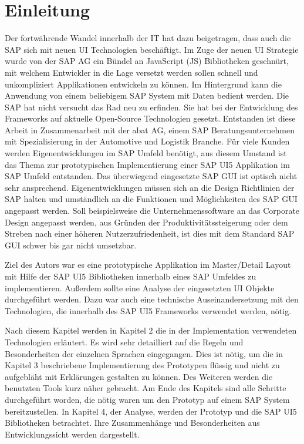 \section{Einleitung}\label{einleitung}
Der fortwährende Wandel innerhalb der IT hat dazu beigetragen, dass auch die SAP sich mit neuen UI Technologien beschäftigt. Im Zuge der neuen UI Strategie wurde von der SAP AG ein Bündel an JavaScript (JS) Bibliotheken geschnürt, mit welchem Entwickler in die Lage versetzt werden sollen schnell und unkompliziert Applikationen entwickeln zu können. Im Hintergrund kann die Anwendung von einem beliebigem SAP System mit Daten bedient werden. Die SAP hat nicht versucht das Rad neu zu erfinden. Sie hat bei der Entwicklung des Frameworks auf aktuelle Open-Source Technologien gesetzt. Entstanden ist diese Arbeit in Zusammenarbeit mit der abat AG, einem SAP Beratungsunternehmen mit Spezialisierung in der Automotive  und Logistik Branche. Für viele Kunden werden Eigenentwicklungen im SAP Umfeld benötigt, aus diesem Umstand ist das Thema zur prototypischen Implementierung einer SAP UI5 Applikation im SAP Umfeld entstanden. Das überwiegend eingesetzte SAP GUI ist optisch nicht sehr ansprechend. Eigenentwicklungen müssen sich an die Design Richtlinien der SAP halten und umständlich an die Funktionen und Möglichkeiten des SAP GUI angepasst werden. Soll beispielsweise die Unternehmenssoftware an das Corporate Design angepasst werden, aus Gründen der Produktivitätssteigerung oder dem Streben nach einer höheren Nutzerzufriedenheit, ist dies mit dem Standard SAP GUI schwer bis gar nicht umsetzbar.\par
Ziel des Autors war es eine prototypische Applikation im Master/Detail Layout mit Hilfe der SAP UI5 Bibliotheken innerhalb eines SAP Umfeldes zu implementieren. Außerdem sollte eine Analyse der eingesetzten UI Objekte durchgeführt werden. Dazu war auch eine technische Auseinandersetzung mit den Technologien, die innerhalb des SAP UI5 Frameworks verwendet werden, nötig.\par
Nach diesem Kapitel werden in Kapitel 2 die in der Implementation verwendeten Technologien erläutert. Es wird sehr detailliert auf die Regeln und Besonderheiten der einzelnen Sprachen eingegangen. Dies ist nötig, um die in Kapitel 3 beschriebene Implementierung des Prototypen flüssig und nicht zu aufgebläht mit Erklärungen gestalten zu können. Des Weiteren werden die benutzten Tools kurz näher gebracht. Am Ende des Kapitels sind alle Schritte durchgeführt worden, die nötig waren um den Prototyp auf einem SAP System bereitzustellen. In Kapitel 4, der Analyse, werden der Prototyp und die SAP UI5 Bibliotheken betrachtet. Ihre Zusammenhänge und Besonderheiten aus Entwicklungssicht werden dargestellt.